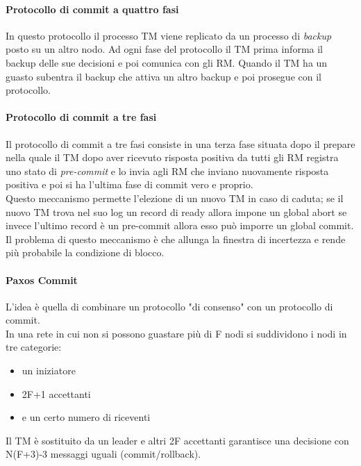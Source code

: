 \paragraph{Protocollo di commit a quattro fasi} In questo protocollo il processo TM viene replicato da un processo di \emph{backup} posto su un altro nodo. Ad ogni fase del protocollo il TM prima informa il backup delle sue decisioni e poi comunica con gli RM.
Quando il TM ha un guasto subentra il backup che attiva un altro backup e poi prosegue con il protocollo.
\paragraph{Protocollo di commit a tre fasi} Il protocollo di commit a tre fasi consiste in una terza fase situata dopo il prepare nella quale il TM dopo aver ricevuto risposta positiva da tutti gli RM registra uno stato di \emph{pre-commit} e lo invia agli RM che inviano nuovamente risposta positiva e poi si ha l'ultima fase di commit vero e proprio.\\
Questo meccanismo permette l'elezione di un nuovo TM in caso di caduta; se il nuovo TM trova nel suo log un record di \textsf{ready} allora impone un \textsf{global abort} se invece l'ultimo record è un \textsf{pre-commit} allora esso può imporre un \textsf{global commit}.\\
Il problema di questo meccanismo è che allunga la finestra di incertezza e rende più probabile la condizione di blocco.
\paragraph{Paxos Commit} L'idea è quella di combinare un protocollo "di consenso" con un protocollo di commit.\\
In una rete in cui non si possono guastare più di F nodi si suddividono i nodi in tre categorie:
\begin{itemize}
\item un iniziatore
\item 2F+1 accettanti
\item e un certo numero di riceventi
\end{itemize}
Il TM è sostituito da un leader e altri 2F accettanti garantisce una decisione con N(F+3)-3 messaggi uguali (commit/rollback).
